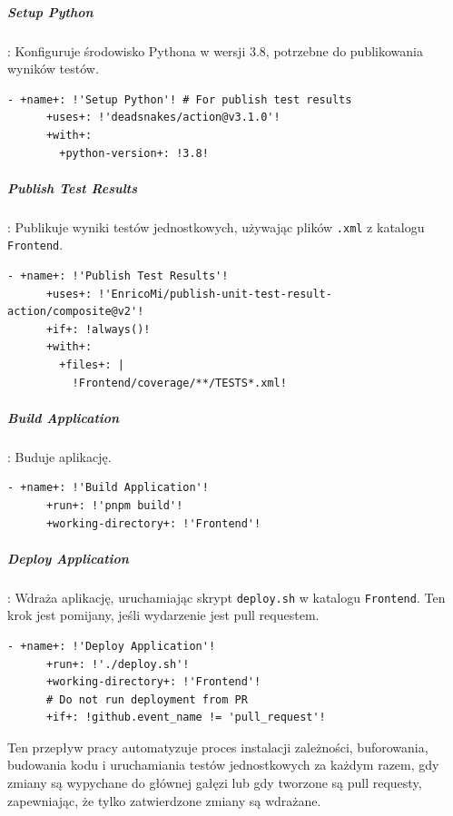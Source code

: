 \subparagraph{Setup Python}: Konfiguruje środowisko Pythona w wersji 3.8, potrzebne do publikowania wyników testów.
\begin{lstlisting}[style=yaml-colored]
    - +name+: !'Setup Python'! # For publish test results
      +uses+: !'deadsnakes/action@v3.1.0'!
      +with+:
        +python-version+: !3.8!
\end{lstlisting}

\subparagraph{Publish Test Results}: Publikuje wyniki testów jednostkowych, używając plików \texttt{\textcolor{codeblue}{.xml}} z katalogu \texttt{\textcolor{codeblue}{Frontend}}.
\begin{lstlisting}[style=yaml-colored]
    - +name+: !'Publish Test Results'!
      +uses+: !'EnricoMi/publish-unit-test-result-action/composite@v2'!
      +if+: !always()!
      +with+:
        +files+: |
          !Frontend/coverage/**/TESTS*.xml!
\end{lstlisting}

\subparagraph{Build Application}: Buduje aplikację.
\begin{lstlisting}[style=yaml-colored]
    - +name+: !'Build Application'!
      +run+: !'pnpm build'!
      +working-directory+: !'Frontend'!
\end{lstlisting}

\subparagraph{Deploy Application}: Wdraża aplikację, uruchamiając skrypt \texttt{\textcolor{codeblue}{deploy.sh}} w katalogu \texttt{\textcolor{codeblue}{Frontend}}. Ten krok jest pomijany, jeśli wydarzenie jest pull requestem.
\begin{lstlisting}[style=yaml-colored]
    - +name+: !'Deploy Application'!
      +run+: !'./deploy.sh'!
      +working-directory+: !'Frontend'!
      # Do not run deployment from PR
      +if+: !github.event_name != 'pull_request'!
\end{lstlisting}

Ten przepływ pracy automatyzuje proces instalacji zależności, buforowania, budowania kodu i uruchamiania testów jednostkowych za każdym razem, gdy zmiany są wypychane do głównej gałęzi lub gdy tworzone są pull requesty, zapewniając, że tylko zatwierdzone zmiany są wdrażane.

